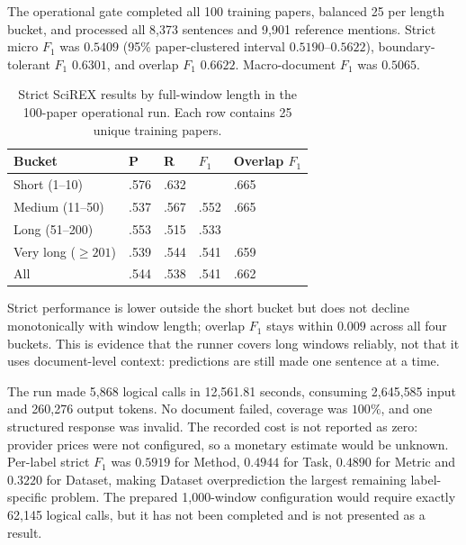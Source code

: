 The operational gate completed all 100 training papers, balanced 25 per length
bucket, and processed all 8{,}373 sentences and 9{,}901 reference mentions.
Strict micro $F_1$ was $0.5409$ (95\% paper-clustered interval
$0.5190$--$0.5622$), boundary-tolerant $F_1$ $0.6301$, and overlap $F_1$
$0.6622$. Macro-document $F_1$ was $0.5065$.

\begin{table}[!t]
\caption{Strict SciREX results by full-window length in the 100-paper
operational run. Each row contains 25 unique training papers.}
\label{tab:length}
\footnotesize
\begin{tabular}{@{}L{1.7cm} C{0.85cm} C{0.85cm} C{0.85cm} C{1.15cm}@{}}
\toprule
\textbf{Bucket} & \textbf{P} & \textbf{R} & \textbf{$F_1$} & \textbf{Overlap $F_1$} \\
\midrule
Short (1--10) & .576 & .632 &  & .665 \\
Medium (11--50) & .537 & .567 & .552 & .665 \\
Long (51--200) & .553 & .515 & .533 &  \\
Very long ($\geq201$) & .539 & .544 & .541 & .659 \\
\midrule
All & .544 & .538 & .541 & .662 \\
\bottomrule
\end{tabular}
\end{table}

Strict performance is lower outside the short bucket but does not decline
monotonically with window length; overlap $F_1$ stays within $0.009$ across all
four buckets. This is evidence that the runner covers long windows reliably,
not that it uses document-level context: predictions are still made one
sentence at a time.

The run made 5{,}868 logical calls in 12{,}561.81 seconds, consuming 2{,}645{,}585
input and 260{,}276 output tokens. No document failed, coverage was $100\%$, and
one structured response was invalid. The recorded cost is not reported as zero:
provider prices were not configured, so a monetary estimate would be unknown.
Per-label strict $F_1$ was $0.5919$ for Method, $0.4944$ for Task, $0.4890$ for
Metric and $0.3220$ for Dataset, making Dataset overprediction the largest
remaining label-specific problem. The prepared 1{,}000-window configuration
would require exactly 62{,}145 logical calls, but it has not been completed and
is not presented as a result.
